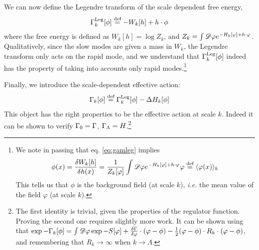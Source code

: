 We can now define the Legendre transform of the scale dependent free energy,
\begin{equation}
\label{eq:gamleg}
\Gamma_k^{\text{Leg}}[\phi]  \overset{\text{def}}{=}  - W_k[h] + h \cdot \phi
\end{equation}
where the free energy is defined as $W_k[h] = \log Z_k$, and $Z_k = \int  \mathscr{D}  \varphi e^{-H_k[\varphi] + h \cdot \varphi} $.
Qualitatively, since the slow modes are given a mass in $W_k$, the Legendre transform only acts on the rapid mode, and we understand that  $\Gamma_k^{\text{Leg}}[\phi]$ indeed has the property of taking into accounts only rapid modes.\footnote{We note in passing that eq. \eqref{eq:gamleg} implies 
\begin{equation}
\phi(x) = \frac{\delta W_k[h]}{
\delta h(x)} = \frac{1}{Z_k[\varphi]} \int  \mathscr{D}  \varphi e^{-H_k[\varphi] + h \cdot \varphi} \varphi  \overset{\text{def}}{=}  \langle \varphi(x) \rangle_k
\end{equation}
This tells us that $\phi$ is the background field (at scale $k$), \textit{i.e.} the mean value of the field $\varphi$ (at scale $k$). }

Finally, we introduce the scale-dependent effective action:
\begin{equation}
\Gamma_k[\phi]  \overset{\text{def}}{=}  \Gamma_k^{\text{Leg}}[\phi] - \Delta H_k[\phi]
\end{equation}
This object has the right properties to be the effective action at scale $k$. Indeed it can be shown to verify $\Gamma_0 = \Gamma$, $\Gamma_\Lambda = H$.\footnote{The first identity is trivial, given the properties of the regulator function. Proving the second one requires slightly more work. It can be shown using that $\exp{-\Gamma_k[\phi]} = \int  \mathscr{D}  \varphi \exp{-S[\varphi] + \frac{\delta \Gamma}{\delta \varphi} \cdot (\varphi - \phi) - \frac{1}{2} (\varphi - \phi ) \cdot R_k \cdot (\varphi - \phi) }$, and remembering that $R_k \rightarrow \infty$ when $k \rightarrow \Lambda$.}


